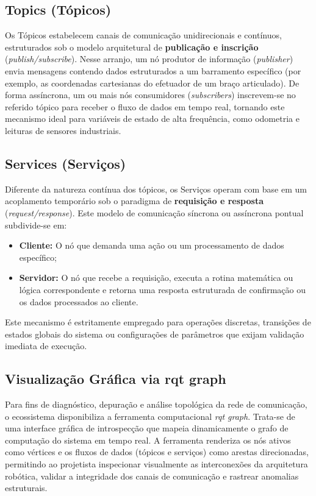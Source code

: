 \subsection{ Topics (Tópicos)}
Os Tópicos estabelecem canais de comunicação unidirecionais e contínuos, estruturados sob o modelo arquitetural de \textbf{publicação e inscrição} (\textit{publish/subscribe}). Nesse arranjo, um nó produtor de informação (\textit{publisher}) envia mensagens contendo dados estruturados a um barramento específico (por exemplo, as coordenadas cartesianas do efetuador de um braço articulado). De forma assíncrona, um ou mais nós consumidores (\textit{subscribers}) inscrevem-se no referido tópico para receber o fluxo de dados em tempo real, tornando este mecanismo ideal para variáveis de estado de alta frequência, como odometria e leituras de sensores industriais.

\subsection{Services (Serviços)}
Diferente da natureza contínua dos tópicos, os Serviços operam com base em um acoplamento temporário sob o paradigma de \textbf{requisição e resposta} (\textit{request/response}). Este modelo de comunicação síncrona ou assíncrona pontual subdivide-se em:
\begin{itemize}
    \item \textbf{Cliente:} O nó que demanda uma ação ou um processamento de dados específico;
    \item \textbf{Servidor:} O nó que recebe a requisição, executa a rotina matemática ou lógica correspondente e retorna uma resposta estruturada de confirmação ou os dados processados ao cliente.
\end{itemize}
Este mecanismo é estritamente empregado para operações discretas, transições de estados globais do sistema ou configurações de parâmetros que exijam validação imediata de execução.

\subsection{Visualização Gráfica via rqt graph}
Para fins de diagnóstico, depuração e análise topológica da rede de comunicação, o ecossistema disponibiliza a ferramenta computacional \textit{rqt graph}. Trata-se de uma interface gráfica de introspecção que mapeia dinamicamente o grafo de computação do sistema em tempo real. A ferramenta renderiza os nós ativos como vértices e os fluxos de dados (tópicos e serviços) como arestas direcionadas, permitindo ao projetista inspecionar visualmente as interconexões da arquitetura robótica, validar a integridade dos canais de comunicação e rastrear anomalias estruturais.

